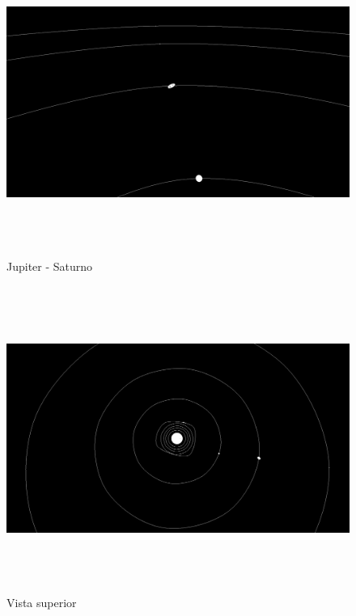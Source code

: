 \documentclass[11pt,a4paper]{report}
\begin{document}
\begin{figure}[H]
\centering
\includegraphics[width = 18cm,height = 10cm]{ss2.png}
\caption{Jupiter - Saturno}
\label{fig:demo2}
\end{figure}

\begin{figure}[H]
\centering
\includegraphics[width = 18cm,height = 10cm]{ss3.png}
\caption{Vista superior}
\label{fig:demo3}
\end{figure}
\end{document}
